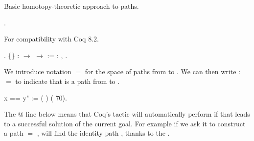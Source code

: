 \documentclass[12pt]{report}
\begin{document}
\begin{coqdoccode}
\end{coqdoccode}
Basic homotopy-theoretic approach to paths. \begin{coqdoccode}
\coqdocemptyline
\coqdocnoindent
{}  .\coqdoceol
\coqdocemptyline
\end{coqdoccode}
For compatibility with Coq 8.2. \begin{coqdoccode}
\coqdocnoindent
{}  .\coqdoceol
\coqdocemptyline
\coqdocnoindent
{}  \{\} :  \ensuremath{\rightarrow}  \ensuremath{\rightarrow}  :=  : \coqdockw{\ensuremath{\forall}} ,   .\coqdoceol
\coqdocemptyline
\coqdocemptyline
\end{coqdoccode}
We introduce notation  $=$  for the space    of paths
   from  to . We can then write  :  $=$  to indicate that
    is a path from  to . \begin{coqdoccode}
\coqdocemptyline
\coqdocnoindent
{}x == y" := (  ) (  70).\coqdoceol
\coqdocemptyline
\end{coqdoccode}
The   @ line below means that Coq's 
   tactic will automatically perform   if that leads to a
   successful solution of the current goal. For example if we ask it
   to construct a path  $=$ ,  will find the identity path
    , thanks to the  .
\end{document}
